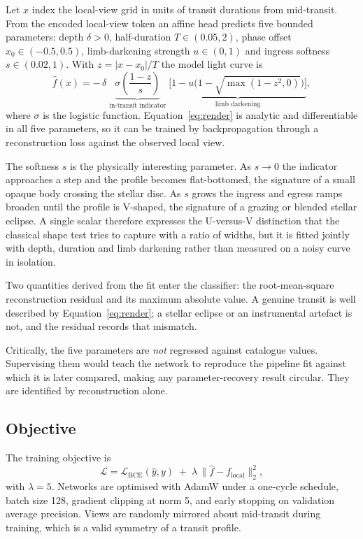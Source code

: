 \documentclass[preprint,12pt,authoryear]{elsarticle}
\begin{document}
Let $x$ index the local-view grid in units of transit durations from
mid-transit. From the encoded local-view token an affine head predicts five
bounded parameters: depth $\delta>0$, half-duration $T\in(0.05,2)$, phase offset
$x_0\in(-0.5,0.5)$, limb-darkening strength $u\in(0,1)$ and ingress softness
$s\in(0.02,1)$. With $z = |x-x_0|/T$ the model light curve is
\begin{equation}
\hat{f}(x) = -\,\delta\;
  \underbrace{\sigma\!\left(\frac{1-z}{s}\right)}_{\text{in-transit indicator}}\;
  \underbrace{\Big[1-u\big(1-\sqrt{\max(1-z^{2},0)}\big)\Big]}_{\text{limb darkening}},
\label{eq:render}
\end{equation}
where $\sigma$ is the logistic function. Equation~\ref{eq:render} is analytic and
differentiable in all five parameters, so it can be trained by backpropagation
through a reconstruction loss against the observed local view.

The softness $s$ is the physically interesting parameter. As $s\to0$ the
indicator approaches a step and the profile becomes flat-bottomed, the signature
of a small opaque body crossing the stellar disc. As $s$ grows the ingress and
egress ramps broaden until the profile is V-shaped, the signature of a grazing
or blended stellar eclipse. A single scalar therefore expresses the U-versus-V
distinction that the classical shape test tries to capture with a ratio of
widths, but it is fitted jointly with depth, duration and limb darkening rather
than measured on a noisy curve in isolation.

Two quantities derived from the fit enter the classifier: the root-mean-square
reconstruction residual and its maximum absolute value. A genuine transit is
well described by Equation~\ref{eq:render}; a stellar eclipse or an instrumental
artefact is not, and the residual records that mismatch.

Critically, the five parameters are \emph{not} regressed against catalogue
values. Supervising them would teach the network to reproduce the pipeline fit
against which it is later compared, making any parameter-recovery result
circular. They are identified by reconstruction alone.

\subsection{Objective}

The training objective is
\begin{equation}
\mathcal{L} = \mathcal{L}_{\mathrm{BCE}}(\hat{y}, y)
  \;+\; \lambda\,\big\| \hat{f} - f_{\mathrm{local}} \big\|_2^2 ,
\label{eq:loss}
\end{equation}
with $\lambda=5$. Networks are optimised with AdamW \citep{Loshchilov2019} under
a one-cycle schedule, batch size 128, gradient clipping at norm 5, and early
stopping on validation average precision. Views are randomly mirrored about
mid-transit during training, which is a valid symmetry of a transit profile.
\end{document}

